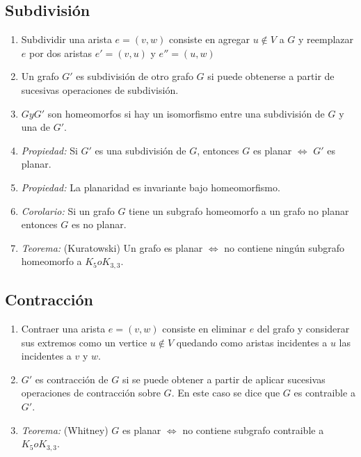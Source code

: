\subsection{Subdivisión}
\begin{enumerate}
\item Subdividir una arista $e=(v,w)$ consiste en agregar $u \notin V$ a $G$ y reemplazar $e$ por dos aristas $e'=(v,u)$ y $e''=(u,w)$
\item Un grafo $G'$ es subdivisión de otro grafo $G$ si puede obtenerse a partir de sucesivas operaciones de subdivisión.
\item $G y G'$ son homeomorfos si hay un isomorfismo entre una subdivisión de $G$ y una de $G'$.
\item \textit{Propiedad:} Si $G'$ es una subdivisión de $G$, entonces $G$ es planar $\iff$ $G'$ es planar.
\item \textit{Propiedad:} La planaridad es invariante bajo homeomorfismo.
\item \textit{Corolario:} Si un grafo $G$ tiene un subgrafo homeomorfo a un grafo no planar entonces $G$ es no planar.
\item \textit{Teorema:} (Kuratowski) Un grafo es planar $\iff$ no contiene ningún subgrafo homeomorfo a $K_{5} o K_{3,3}$.
\end{enumerate}

\subsection{Contracción}
\begin{enumerate}
\item Contraer una arista $e=(v,w)$ consiste en eliminar $e$ del grafo y considerar sus extremos como un vertice $u \notin V$ quedando como aristas incidentes a $u$ las incidentes a $v$ y $w$.
\item $G'$ es contracción de $G$ si se puede obtener a partir de aplicar sucesivas operaciones de contracción sobre $G$. En este caso se dice que $G$ es contraible a $G'$.
\item \textit{Teorema:} (Whitney) $G$ es planar $\iff$ no contiene subgrafo contraible a $K_{5} o K_{3,3}$.
\end{enumerate}


